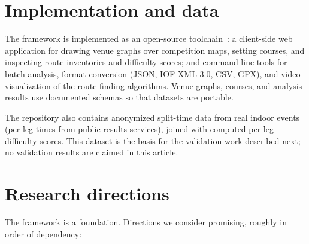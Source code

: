 \documentclass[11pt,a4paper,twocolumn]{article}
\begin{document}
\section{Implementation and data}
\label{sec:implementation}

The framework is implemented as an open-source toolchain~\cite{repo}: a
client-side web application for drawing venue graphs over competition maps,
setting courses, and inspecting route inventories and difficulty scores; and
command-line tools for batch analysis, format conversion (JSON, IOF XML 3.0,
CSV, GPX), and video visualization of the route-finding algorithms. Venue
graphs, courses, and analysis results use documented schemas so that datasets
are portable.

The repository also contains anonymized split-time data from real indoor
events (per-leg times from public results services), joined with computed
per-leg difficulty scores. This dataset is the basis for the validation work
described next; no validation results are claimed in this article.

\section{Research directions}
\label{sec:research}

The framework is a foundation. Directions we consider promising, roughly in
order of dependency:
\end{document}
